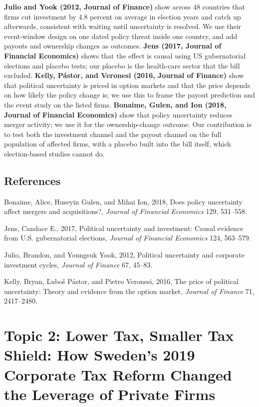 \documentclass[12pt,a4paper]{article}
\newenvironment{refs}{\begin{list}{}{\setlength{\leftmargin}{1.5em}\setlength{\itemindent}{-1.5em}\setlength{\itemsep}{1pt}}}{\end{list}}
\begin{document}
\textbf{Julio and Yook (2012, Journal of Finance)} show across 48 countries that firms cut investment by 4.8 percent on average in election years and catch up afterwards, consistent with waiting until uncertainty is resolved. We use their event-window design on one dated policy threat inside one country, and add payouts and ownership changes as outcomes. \textbf{Jens (2017, Journal of Financial Economics)} shows that the effect is causal using US gubernatorial elections and placebo tests; our placebo is the health-care sector that the bill excluded. \textbf{Kelly, P\'astor, and Veronesi (2016, Journal of Finance)} show that political uncertainty is priced in option markets and that the price depends on how likely the policy change is; we use this to frame the payout prediction and the event study on the listed firms. \textbf{Bonaime, Gulen, and Ion (2018, Journal of Financial Economics)} show that policy uncertainty reduces merger activity; we use it for the ownership-change outcome. Our contribution is to test both the investment channel and the payout channel on the full population of affected firms, with a placebo built into the bill itself, which election-based studies cannot do.

\subsection*{References}
\begin{refs}
\item Bonaime, Alice, Huseyin Gulen, and Mihai Ion, 2018, Does policy uncertainty affect mergers and acquisitions?, \emph{Journal of Financial Economics} 129, 531--558.
\item Jens, Candace E., 2017, Political uncertainty and investment: Causal evidence from U.S. gubernatorial elections, \emph{Journal of Financial Economics} 124, 563--579.
\item Julio, Brandon, and Youngsuk Yook, 2012, Political uncertainty and corporate investment cycles, \emph{Journal of Finance} 67, 45--83.
\item Kelly, Bryan, \v{L}ubo\v{s} P\'astor, and Pietro Veronesi, 2016, The price of political uncertainty: Theory and evidence from the option market, \emph{Journal of Finance} 71, 2417--2480.
\end{refs}

\newpage

\section{Topic 2: Lower Tax, Smaller Tax Shield: How Sweden's 2019 Corporate Tax Reform Changed the Leverage of Private Firms}
\end{document}
